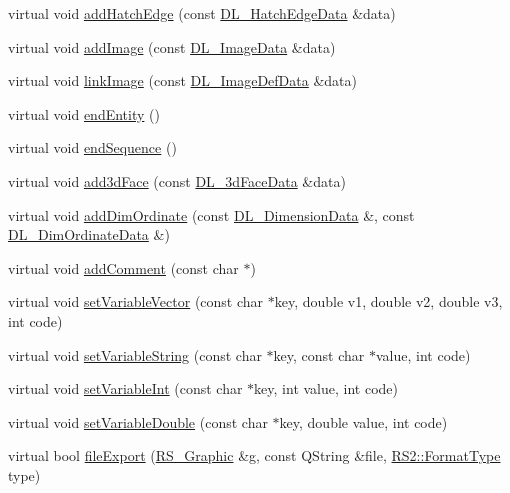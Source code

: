 \begin{DoxyCompactItemize}
\item 
virtual void \hyperlink{classRS__FilterDXF_a099b5af7877dd3c248011683f6be0a47}{add\-Hatch\-Edge} (const \hyperlink{structDL__HatchEdgeData}{D\-L\-\_\-\-Hatch\-Edge\-Data} \&data)
\item 
virtual void \hyperlink{classRS__FilterDXF_a5e5209a571542f3bb4c62366d2190c06}{add\-Image} (const \hyperlink{structDL__ImageData}{D\-L\-\_\-\-Image\-Data} \&data)
\item 
virtual void \hyperlink{classRS__FilterDXF_a5625281f73cf5c1ba06786b0b743adbb}{link\-Image} (const \hyperlink{structDL__ImageDefData}{D\-L\-\_\-\-Image\-Def\-Data} \&data)
\item 
virtual void \hyperlink{classRS__FilterDXF_a76fda94ba8e5992b01a3d04bcf0596c9}{end\-Entity} ()
\item 
virtual void \hyperlink{classRS__FilterDXF_a782f9a0f595213b12339612da549b870}{end\-Sequence} ()
\item 
virtual void \hyperlink{classRS__FilterDXF_ab3be1461298a0a133a507a2df3553fd7}{add3d\-Face} (const \hyperlink{structDL__TraceData}{D\-L\-\_\-3d\-Face\-Data} \&data)
\item 
virtual void \hyperlink{classRS__FilterDXF_ab015cacfefde7b9dfc45f16fa2e5cd17}{add\-Dim\-Ordinate} (const \hyperlink{structDL__DimensionData}{D\-L\-\_\-\-Dimension\-Data} \&, const \hyperlink{structDL__DimOrdinateData}{D\-L\-\_\-\-Dim\-Ordinate\-Data} \&)
\item 
virtual void \hyperlink{classRS__FilterDXF_af350ce43905a83f0278ae8bdf0d9f32a}{add\-Comment} (const char $\ast$)
\item 
virtual void \hyperlink{classRS__FilterDXF_aa15ef5accc8540ab6f3bb77332e1a36b}{set\-Variable\-Vector} (const char $\ast$key, double v1, double v2, double v3, int code)
\item 
virtual void \hyperlink{classRS__FilterDXF_a80a149bd1e1bba2df3f2a9245f83f467}{set\-Variable\-String} (const char $\ast$key, const char $\ast$value, int code)
\item 
virtual void \hyperlink{classRS__FilterDXF_a84feb7c6a1839ead1ed6740b39397085}{set\-Variable\-Int} (const char $\ast$key, int value, int code)
\item 
virtual void \hyperlink{classRS__FilterDXF_a95f9096b80146c6a0cf13f42fcb30e3b}{set\-Variable\-Double} (const char $\ast$key, double value, int code)
\item 
virtual bool \hyperlink{classRS__FilterDXF_a55df0d99d7b7c67b94975b91cb85d191}{file\-Export} (\hyperlink{classRS__Graphic}{R\-S\-\_\-\-Graphic} \&g, const Q\-String \&file, \hyperlink{classRS2_a077a6c94c9a0ab9962c4d4a612c7189b}{R\-S2\-::\-Format\-Type} type)

\end{DoxyCompactItemize}
